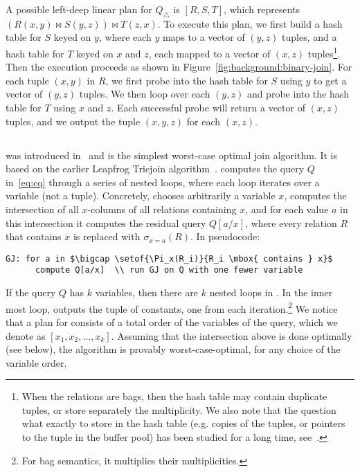 \begin{ex}
  A possible left-deep linear plan for $Q_\triangle$ is $[R, S, T]$,
  which represents $(R(x,y) \Join S(y,z)) \Join T(z,x)$.  To execute
  this plan, we first build a hash table for $S$ keyed on $y$, where
  each $y$ maps to a vector of $(y,z)$ tuples, 
  and a hash table for $T$ keyed on $x$ and $z$, each mapped to a
  vector of $(x,z)$ tuples\footnote{When the relations are bags, then
    the hash table may contain duplicate tuples, or store separately
    the multiplicity.  We also note that the question what exactly to
    store in the hash table (e.g. copies of the tuples, or pointers to
    the tuple in the buffer pool) has been studied for a long time,
    see~\cite{DBLP:journals/csur/Graefe93}.}.  Then the execution
  proceeds as shown in Figure~\ref{fig:background:binary-join}.  For each
  tuple $(x, y)$ in $R$, we first probe into the hash table for $S$
  using $y$ to get a vector of $(y, z)$ tuples.  We then loop over
  each $(y, z)$ and probe into the hash table for $T$ using $x$ and
  $z$.  Each successful probe will return a vector of $(x, z)$ tuples,
  and we output the tuple $(x, y, z)$ for each $(x, z)$.
\end{ex}

\subsection{\GJ}\label{sec:background:gj}

\GJ was introduced in~\cite{DBLP:journals/sigmod/NgoRR13} and is the
simplest worst-case optimal join algorithm.  It is based on the
earlier Leapfrog Triejoin algorithm~\cite{DBLP:conf/icdt/Veldhuizen14}.
%
\GJ computes the query $Q$ in~\eqref{eq:cq} through a series of nested
loops, where each loop iterates over a variable (not a tuple).
Concretely, \GJ chooses arbitrarily a variable $x$, computes the
intersection of all $x$-columns of all relations containing $x$, and
for each value $a$ in this intersection it computes the residual query
$Q[a/x]$, where every relation $R$ that contains $x$ is replaced with
$\sigma_{x=a}(R)$.  In pseudocode:
%
\begin{lstlisting}
GJ: for a in $\bigcap \setof{\Pi_x(R_i)}{R_i \mbox{ contains } x}$
      compute Q[a/x]  \\ run GJ on Q with one fewer variable
\end{lstlisting}
%
If the query $Q$ has $k$ variables, then there are $k$ nested loops in
\GJ.  In the inner most loop, \GJ outputs the tuple of constants, one
from each iteration.\footnote{For bag semantics, it multiplies their
  multiplicities.}  We notice that a plan for \GJ consists of a total
order of the variables of the query, which we denote as
$[x_1, x_2, \ldots, x_k]$.  Assuming that the intersection above is
done optimally (see below), the algorithm is provably
worst-case-optimal, for any choice of the variable order.

